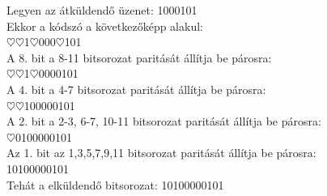 \documentclass[margin=0px]{article}
\begin{document}
\begin{description}
\begin{itemize}
						Legyen az átküldendő üzenet: 1000101 \\
						Ekkor a kódszó a következőképp alakul: \\
							{\color[rgb]{1,0,0}$\heartsuit\heartsuit$}1{\color[rgb]{1,0,0}$\heartsuit$}000{\color[rgb]{1,0,0}$\heartsuit$}101\\
							A 8. bit a 8-11  bitsorozat paritását állítja be párosra:\\
							{\color[rgb]{1,0,0}$\heartsuit\heartsuit$}1{\color[rgb]{1,0,0}$\heartsuit$}000{\color[rgb]{0,0,1}0101}\\
							A 4. bit a 4-7  bitsorozat paritását állítja be párosra:\\
							{\color[rgb]{1,0,0}$\heartsuit\heartsuit$}1{\color[rgb]{0,0,1}0000}0101\\
							A 2. bit a 2-3, 6-7, 10-11 bitsorozat paritását állítja be párosra:\\
							{\color[rgb]{1,0,0}$\heartsuit$}{\color[rgb]{0,0,1}01}00{\color[rgb]{0,0,1}00}01{\color[rgb]{0,0,1}01}\\
							Az 1. bit az 1,3,5,7,9,11 bitsorozat paritását állítja be párosra: \\
							{\color[rgb]{0,0,1}1}0{\color[rgb]{0,0,1}1}0{\color[rgb]{0,0,1}0}0{\color[rgb]{0,0,1}0}0{\color[rgb]{0,0,1}1}0{\color[rgb]{0,0,1}1}\\
							
							Tehát a elküldendő bitsorozat:
							{\color[rgb]{1,0,0}10}1{\color[rgb]{1,0,0}0}000{\color[rgb]{1,0,0}0}101\\
				

\end{itemize}
\end{description}
\end{document}
